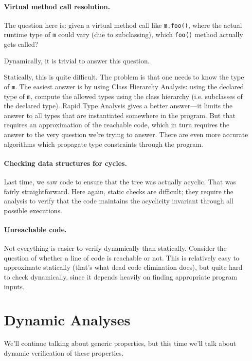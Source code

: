\documentclass[11pt]{article}
\begin{document}
{\paragraph{Virtual method call resolution.} The question here is:
given a virtual method call like {\tt m.foo()}, where the actual runtime type of {\tt m} 
could vary (due to subclassing), which {\tt foo()} method actually gets called?

Dynamically, it is trivial to answer this question.

Statically, this is quite difficult. The problem is that one needs to
know the type of {\tt m}.  The easiest answer is by using Class
Hierarchy Analysis: using the declared type of {\tt m}, compute the
allowed types using the class hierarchy (i.e. subclasses of the
declared type).  Rapid Type Analysis gives a better answer---it limits
the answer to all types that are instantiated somewhere in the
program. But that requires an approximation of the reachable code,
which in turn requires the answer to the very question we're trying to
answer.  There are even more accurate algorithms which propagate type
constraints through the program.

\paragraph{Checking data structures for cycles.} Last time, we saw code
to ensure that the tree was actually acyclic. That was fairly straightforward.
Here again, static checks are difficult; they require the analysis to verify that
the code maintains the acyclicity invariant through all possible executions.

\paragraph{Unreachable code.} Not everything is easier to verify dynamically
than statically. Consider the question of whether a line of code is reachable
or not. This is relatively easy to approximate statically (that's what dead
code elimination does), but quite hard to check dynamically, since it depends
heavily on finding appropriate program inputs.

\section*{Dynamic Analyses}
We'll continue talking about generic properties, but this time we'll talk about
dynamic verification of these properties.

}
\end{document}
